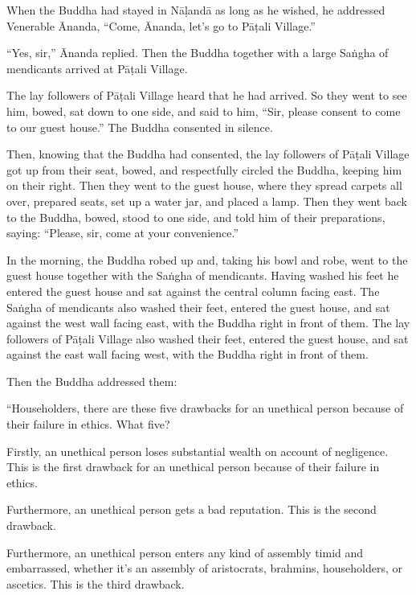 \documentclass[12pt,openany]{book}%
\begin{document}
When the Buddha had stayed in \textsanskrit{Nāḷandā} as long as he wished, he addressed Venerable Ānanda, “Come, Ānanda, let’s go to \textsanskrit{Pāṭali} Village.” 

“Yes, sir,” Ānanda replied. Then the Buddha together with a large \textsanskrit{Saṅgha} of mendicants arrived at \textsanskrit{Pāṭali} Village. 

The lay followers of \textsanskrit{Pāṭali} Village heard that he had arrived. So they went to see him, bowed, sat down to one side, and said to him, “Sir, please consent to come to our guest house.” The Buddha consented in silence. 

Then, knowing that the Buddha had consented, the lay followers of \textsanskrit{Pāṭali} Village got up from their seat, bowed, and respectfully circled the Buddha, keeping him on their right. Then they went to the guest house, where they spread carpets all over, prepared seats, set up a water jar, and placed a lamp. Then they went back to the Buddha, bowed, stood to one side, and told him of their preparations, saying: “Please, sir, come at your convenience.” 

In the morning, the Buddha robed up and, taking his bowl and robe, went to the guest house together with the \textsanskrit{Saṅgha} of mendicants. Having washed his feet he entered the guest house and sat against the central column facing east. The \textsanskrit{Saṅgha} of mendicants also washed their feet, entered the guest house, and sat against the west wall facing east, with the Buddha right in front of them. The lay followers of \textsanskrit{Pāṭali} Village also washed their feet, entered the guest house, and sat against the east wall facing west, with the Buddha right in front of them. 

Then the Buddha addressed them: 

“Householders, there are these five drawbacks for an unethical person because of their failure in ethics. What five? 

Firstly, an unethical person loses substantial wealth on account of negligence. This is the first drawback for an unethical person because of their failure in ethics. 

Furthermore, an unethical person gets a bad reputation. This is the second drawback. 

Furthermore, an unethical person enters any kind of assembly timid and embarrassed, whether it’s an assembly of aristocrats, brahmins, householders, or ascetics. This is the third drawback. 
\end{document}
